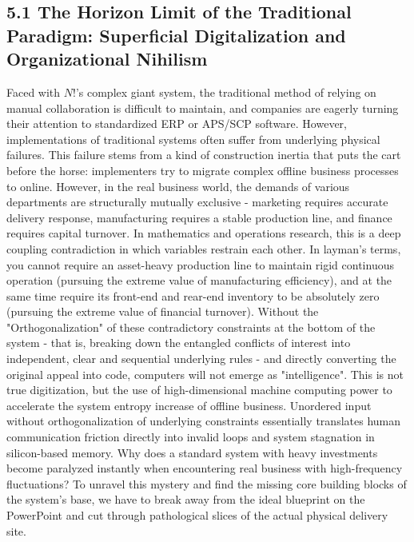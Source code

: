 \documentclass[11pt,a4paper]{article}
\begin{document}
\subsection*{5.1 The Horizon Limit of the Traditional Paradigm: Superficial Digitalization and Organizational Nihilism}


Faced with $N!$'s complex giant system, the traditional method of relying on manual collaboration is difficult to maintain, and companies are eagerly turning their attention to standardized ERP or APS/SCP software. However, implementations of traditional systems often suffer from underlying physical failures. This failure stems from a kind of construction inertia that puts the cart before the horse: implementers try to migrate complex offline business processes to online. However, in the real business world, the demands of various departments are structurally mutually exclusive - marketing requires accurate delivery response, manufacturing requires a stable production line, and finance requires capital turnover. In mathematics and operations research, this is a deep coupling contradiction in which variables restrain each other. In layman's terms, you cannot require an asset-heavy production line to maintain rigid continuous operation (pursuing the extreme value of manufacturing efficiency), and at the same time require its front-end and rear-end inventory to be absolutely zero (pursuing the extreme value of financial turnover). Without the "Orthogonalization" of these contradictory constraints at the bottom of the system - that is, breaking down the entangled conflicts of interest into independent, clear and sequential underlying rules - and directly converting the original appeal into code, computers will not emerge as "intelligence". This is not true digitization, but the use of high-dimensional machine computing power to accelerate the system entropy increase of offline business. Unordered input without orthogonalization of underlying constraints essentially translates human communication friction directly into invalid loops and system stagnation in silicon-based memory. Why does a standard system with heavy investments become paralyzed instantly when encountering real business with high-frequency fluctuations? To unravel this mystery and find the missing core building blocks of the system’s base, we have to break away from the ideal blueprint on the PowerPoint and cut through pathological slices of the actual physical delivery site.
\end{document}
